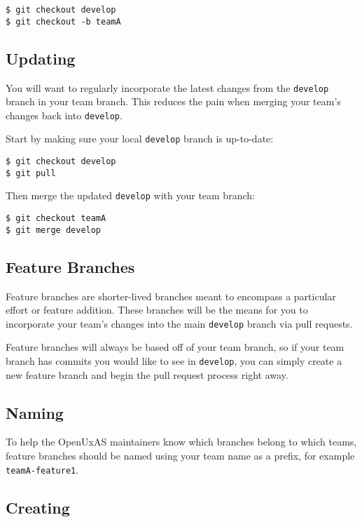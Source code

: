 \begin{verbatim}
$ git checkout develop
$ git checkout -b teamA
\end{verbatim}

\subsection{Updating}\label{updating}

You will want to regularly incorporate the latest changes from the
\texttt{develop} branch in your team branch. This reduces the pain when
merging your team's changes back into \texttt{develop}.

Start by making sure your local \texttt{develop} branch is up-to-date:

\begin{verbatim}
$ git checkout develop
$ git pull
\end{verbatim}

Then merge the updated \texttt{develop} with your team branch:

\begin{verbatim}
$ git checkout teamA
$ git merge develop
\end{verbatim}

\subsection{Feature Branches}\label{feature-branches}

Feature branches are shorter-lived branches meant to encompass a
particular effort or feature addition. These branches will be the means
for you to incorporate your team's changes into the main
\texttt{develop} branch via pull requests.

Feature branches will always be based off of your team branch, so if
your team branch has commits you would like to see in \texttt{develop},
you can simply create a new feature branch and begin the pull request
process right away.

\subsection{Naming}\label{naming}

To help the OpenUxAS maintainers know which branches belong to which
teams, feature branches should be named using your team name as a
prefix, for example \texttt{teamA-feature1}.

\subsection{Creating}\label{creating-1}

